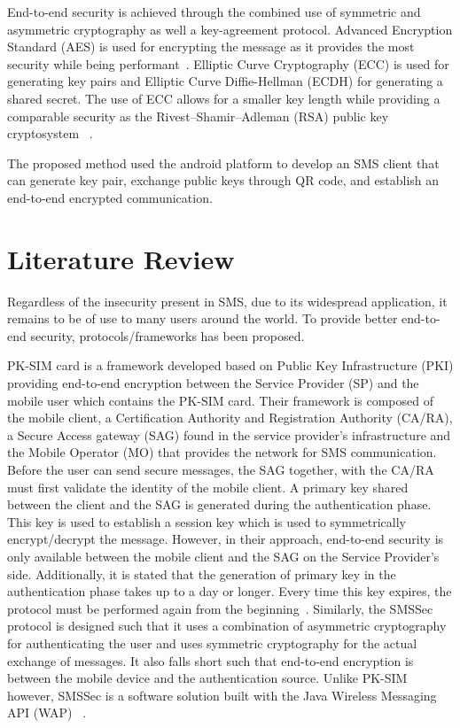 \documentclass{report}
\begin{document}
End-to-end security is achieved through the combined use of symmetric and
asymmetric cryptography as well a key-agreement protocol. Advanced Encryption
Standard (AES) is used for encrypting the message as it provides the
most security while being performant~\cite{Karale_Pendke_Dahiwale_2015}.
Elliptic Curve Cryptography (ECC) is used for generating key pairs and
Elliptic Curve Diffie-Hellman (ECDH) for generating a shared secret. The use
of ECC allows for a smaller key length while providing a
comparable security as the Rivest–Shamir–Adleman (RSA) public key cryptosystem
~\cite{Amara_Siad_2011}.

The proposed method used the android platform to develop an SMS client
that can generate key pair, exchange public keys through QR code, and establish
an end-to-end encrypted communication.

\section{Literature Review}
Regardless of the insecurity present in SMS, due to its widespread
application, it remains to be of use to many users around the world.
To provide better end-to-end security, protocols/frameworks has been proposed.

PK-SIM card is a framework developed based on Public Key
Infrastructure (PKI) providing end-to-end encryption between the Service
Provider (SP) and the mobile user which contains the PK-SIM card. Their
framework is composed of the mobile client, a Certification Authority and
Registration Authority (CA/RA), a Secure Access gateway (SAG) found in the service provider's infrastructure and the Mobile Operator (MO) that
provides the network for SMS communication. Before the user can send secure
messages, the SAG together, with the CA/RA must first validate the identity
of the mobile client. A primary key shared between the client and the SAG is
generated during the authentication phase. This key is used to establish
a session key which is used to symmetrically encrypt/decrypt the message.
However, in their approach, end-to-end security is only available between
the mobile client and the SAG on the Service Provider's side. Additionally,
it is stated that the generation of primary key in the authentication phase
takes up to a day or longer. Every time this key expires, the protocol must
be performed again from the beginning~\cite{PKSIMcard07}. Similarly, the SMSSec
protocol is designed such that it uses a combination of asymmetric
cryptography for authenticating the user and uses symmetric cryptography
for the actual exchange of messages. It also falls short such that
end-to-end encryption is between the mobile device and the authentication
source. Unlike PK-SIM however, SMSSec is a software solution built with
the Java Wireless Messaging API (WAP) ~\cite{SMSSec08}.
\end{document}
